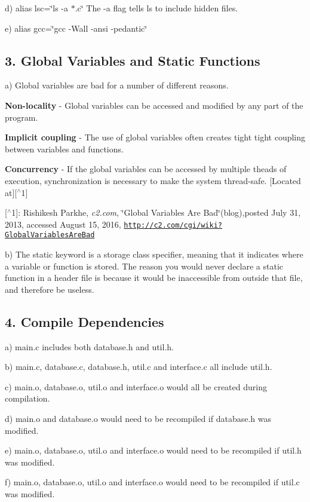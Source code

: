 d) {\ttfamily alias lsc=\char`\"{}ls -\/a $\ast$.\+c\char`\"{}} The {\ttfamily -\/a} flag tells ls to include hidden files.

e) {\ttfamily alias gcc=\char`\"{}gcc -\/\+Wall -\/ansi -\/pedantic\char`\"{}}

\subsection*{3. Global Variables and Static Functions}

a) Global variables are bad for a number of different reasons.
\begin{DoxyItemize}
\item {\bfseries Non-\/locality} -\/ Global variables can be accessed and modified by any part of the program.
\item {\bfseries Implicit coupling} -\/ The use of global variables often creates tight tight coupling between variables and functions.
\item {\bfseries Concurrency} -\/ If the global variables can be accessed by multiple theads of execution, synchronization is necessary to make the system thread-\/safe. \mbox{[}Located at\mbox{]}\mbox{[}$^\wedge$1\mbox{]}
\end{DoxyItemize}

\mbox{[}$^\wedge$1\mbox{]}\+: Rishikesh Parkhe, {\itshape c2.\+com}, \char`\"{}\+Global Variables Are Bad\char`\"{}(blog),posted July 31, 2013, accessed August 15, 2016, \href{http://c2.com/cgi/wiki?GlobalVariablesAreBad}{\tt http\+://c2.\+com/cgi/wiki?\+Global\+Variables\+Are\+Bad}

b) The {\ttfamily static} keyword is a storage class specifier, meaning that it indicates where a variable or function is stored. The reason you would never declare a static function in a header file is because it would be inaccessible from outside that file, and therefore be useless.

\subsection*{4. Compile Dependencies}

a) {\ttfamily main.\+c} includes both {\ttfamily database.\+h} and {\ttfamily util.\+h}.

b) {\ttfamily main.\+c}, {\ttfamily database.\+c}, {\ttfamily database.\+h}, {\ttfamily util.\+c} and {\ttfamily interface.\+c} all include {\ttfamily util.\+h}.

c) {\ttfamily main.\+o}, {\ttfamily database.\+o}, {\ttfamily util.\+o} and {\ttfamily interface.\+o} would all be created during compilation.

d) {\ttfamily main.\+o} and {\ttfamily database.\+o} would need to be recompiled if {\ttfamily database.\+h} was modified.

e) {\ttfamily main.\+o}, {\ttfamily database.\+o}, {\ttfamily util.\+o} and {\ttfamily interface.\+o} would need to be recompiled if {\ttfamily util.\+h} was modified.

f) {\ttfamily main.\+o}, {\ttfamily database.\+o}, {\ttfamily util.\+o} and {\ttfamily interface.\+o} would need to be recompiled if {\ttfamily util.\+c} was modified. 